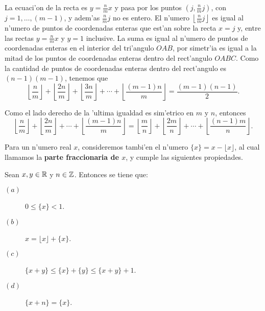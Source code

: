La ecuaci'on de la recta es $y=\frac{n}{m} x$ y pasa por los puntos 
$(j, \frac{n}{m} j)$, con $j=1,\ldots, (m-1)$, y adem'as $\frac{n}{m} j$ 
no es entero. 
El n'umero $\left \lfloor \frac{n}{m} j\right \rfloor$ es igual al n'umero de 
puntos de coordenadas enteras que est'an sobre la recta $x=j$ y, entre las 
rectas $y=\frac{n}{m} x$ y $y=1$ inclusive. La suma es igual al n'umero 
de puntos de coordenadas enteras  en el interior del tri'angulo $OAB$, 
por simetr'ia es 
igual a la mitad de los puntos de coordenadas enteras dentro del rect'angulo 
$OABC$. Como 
la cantidad de  puntos de coordenadas enteras dentro del rect'angulo 
es $(n-1)(m-1)$, tenemos que
$$
\left\lfloor \dfrac{n}{m}\right\rfloor +\left \lfloor \dfrac{2n}{m}\right 
\rfloor + \left\lfloor\dfrac{3n}{m}\right \rfloor +\cdots +
\left\lfloor\dfrac{(m-1)n}{m}\right \rfloor =\dfrac{(m-1)(n-1)}{2}.
$$

\vei

\begin{observacion}
Como el lado derecho de la 'ultima igualdad es sim'etrico en $m$ y $n$, 
entonces
$$\left\lfloor \dfrac{n}{m}\right\rfloor +\left \lfloor \dfrac{2n}{m}\right 
\rfloor + \cdots +
\left\lfloor\dfrac{(m-1)n}{m}\right \rfloor =
\left\lfloor \dfrac{m}{n}\right\rfloor +\left \lfloor \dfrac{2m}{n}\right 
\rfloor + \cdots +
\left\lfloor\dfrac{(n-1)m}{n}\right \rfloor.$$
\end{observacion}

\ve

Para un n'umero real $x$, consideremos tambi'en el n'umero
$\{x\}=x - \lfloor x \rfloor$, al cual  llamamos la 
{\bf parte fraccionaria de $x$},
y  cumple las siguientes propiedades. 

\begin{propiedades} Sean $x, y \in \mathbb{R}$ y $n \in \mathbb{Z}$. Entonces se tiene que:
\begin{description}
\item[$(a)$] $0 \leq \{x\} <1$.

\item[$(b)$] $x =  \lfloor x \rfloor  + \{x\}$.

\item[$(c)$] $\{x+ y\} \leq \{x\} + \{y\} \leq  \{x +y\} +1$.

\item[$(d)$] $\{ x +n \}= \{x\}$.

\end{description}
\end{propiedades}


\ve


